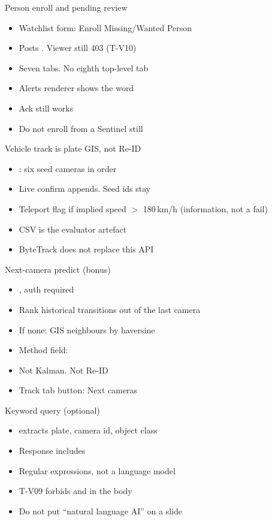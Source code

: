 \documentclass[aspectratio=169,11pt]{beamer}
\begin{document}
\begin{frame}{Person enroll and pending review}
\begin{itemize}\itemsep0.55em
\item Watchlist form: Enroll Missing/Wanted Person
\item Posts . Viewer still 403 (T-V10)
\item Seven tabs. No eighth top-level tab
\item Alerts renderer shows the word 
\item Ack still works
\item Do not enroll from a Sentinel still
\end{itemize}
\end{frame}

\begin{frame}{Vehicle track is plate GIS, not Re-ID}
\begin{itemize}\itemsep0.55em
\item {}: six seed cameras in order
\item Live confirm appends. Seed ids stay
\item Teleport flag if implied speed $>$ 180\,km/h (information, not a fail)
\item CSV is the evaluator artefact
\item ByteTrack does not replace this API
\end{itemize}
\end{frame}

\begin{frame}{Next-camera predict (bonus)}
\begin{itemize}\itemsep0.55em
\item {}, auth required
\item Rank historical transitions out of the last camera
\item If none: GIS neighbours by haversine
\item Method field: 
\item Not Kalman. Not Re-ID
\item Track tab button: Next cameras
\end{itemize}
\end{frame}

\begin{frame}{Keyword query (optional)}
\begin{itemize}\itemsep0.55em
\item {} extracts plate, camera id, object class
\item Response includes 
\item Regular expressions, not a language model
\item T-V09 forbids  and  in the body
\item Do not put ``natural language AI'' on a slide
\end{itemize}
\end{frame}
\end{document}
